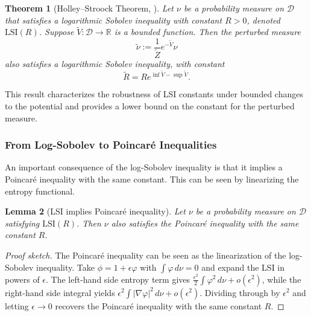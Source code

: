 \documentclass[11pt, twoside]{report}
\newtheorem{theorem}{Theorem}[section]
\newtheorem{lemma}[theorem]{Lemma}
\begin{document}
\begin{theorem}[Holley--Stroock Theorem, \cite{Holley1987}]
Let $\nu$ be a probability measure on $\mathcal{D}$ that satisfies a logarithmic Sobolev inequality with constant $R > 0$, denoted $\mathrm{LSI}(R)$. Suppose $\tilde{V}:\mathcal{D} \to \mathbb{R}$ is a bounded function. Then the perturbed measure
\[
\tilde{\nu} := \frac{1}{\tilde{Z}} e^{-\tilde{V}} \nu
\]
also satisfies a logarithmic Sobolev inequality, with constant
\[
\tilde{R} = R e^{\inf \tilde{V} - \sup \tilde{V}}.
\]
\end{theorem}

This result characterizes the robustness of LSI constants under bounded changes to the potential and provides a lower bound on the constant for the perturbed measure.


\subsubsection{From Log-Sobolev to Poincaré Inequalities}

An important consequence of the log-Sobolev inequality is that it implies a Poincaré inequality with the same constant. This can be seen by linearizing the entropy functional.

\begin{lemma}[LSI implies Poincaré inequality]
Let $\nu$ be a probability measure on $\mathcal{D}$ satisfying $\mathrm{LSI}(R)$. Then $\nu$ also satisfies the Poincaré inequality with the same constant $R$.
\end{lemma}
\begin{proof}[Proof sketch]
The Poincaré inequality can be seen as the linearization of the log-Sobolev inequality.  
Take $\phi = 1 + \epsilon \varphi$ with $\int \varphi\, d\nu = 0$ and expand the LSI in powers of $\epsilon$.  
The left-hand side entropy term gives $\tfrac{\epsilon^2}{2}\int \varphi^2\, d\nu + o(\epsilon^2)$, while the right-hand side integral yields $\epsilon^2 \int |\nabla \varphi|^2\, d\nu + o(\epsilon^2)$.  
Dividing through by $\epsilon^2$ and letting $\epsilon \to 0$ recovers the Poincaré inequality with the same constant $R$.
\end{proof}
\end{document}
